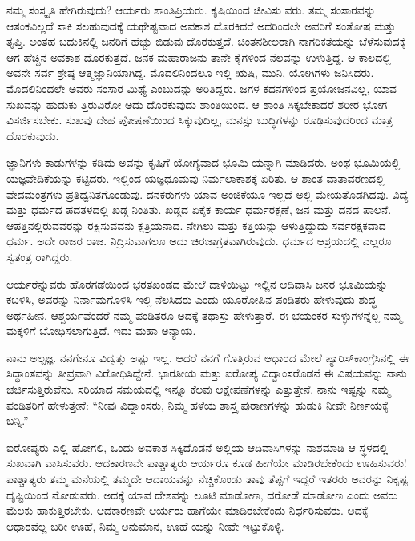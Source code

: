 ನಮ್ಮ ಸಂಸ್ಕೃತಿ ಹೇಗಿರುವುದು? ಆರ್ಯರು ಶಾಂತಿಪ್ರಿಯರು. ಕೃಷಿಯಿಂದ ಜೀವಿಸು ವರು. ತಮ್ಮ ಸಂಸಾರವನ್ನು ಆತಂಕವಿಲ್ಲದೆ ಸಾಕಿ ಸಲಹುವುದಕ್ಕೆ ಯಥೇಷ್ಟವಾದ ಅವಕಾಶ ದೊರಕಿದರೆ ಅದರಿಂದಲೇ ಅವರಿಗೆ ಸಂತೋಷ ಮತ್ತು ತೃಪ್ತಿ. ಅಂತಹ ಬದುಕಿನಲ್ಲಿ ಜನರಿಗೆ ಹೆಚ್ಚು ಬಿಡುವು ದೊರಕುತ್ತದೆ. ಚಿಂತನಶೀಲರಾಗಿ ನಾಗರಿಕತೆಯನ್ನು ಬೆಳೆಸುವುದಕ್ಕೆ ಆಗ ಹೆಚ್ಚಿನ ಅವಕಾಶ ದೊರಕುತ್ತದೆ. ಜನಕ ಮಹಾರಾಜನು ತಾನೇ ಕೈಗಳಿಂದ ನೆಲವನ್ನು ಉಳುತ್ತಿದ್ದ. ಆ ಕಾಲದಲ್ಲಿ ಅವನೇ ಸರ್ವ ಶ್ರೇಷ್ಠ ಆತ್ಮಜ್ಞಾನಿಯಾಗಿದ್ದ. ಮೊದಲಿನಿಂದಲೂ ಇಲ್ಲಿ ಋಷಿ, ಮುನಿ, ಯೋಗಿಗಳು ಜನಿಸಿದರು. ಮೊದಲಿನಿಂದಲೇ ಅವರು ಸಂಸಾರ ಮಿಥ್ಯೆ ಎಂಬುದನ್ನು ಅರಿತಿದ್ದರು. ಜಗಳ ಕದನಗಳಿಂದ ಪ್ರಯೋಜನವಿಲ್ಲ, ಯಾವ ಸುಖವನ್ನು ಹುಡುಕು ತ್ತಿರುವಿರೋ ಅದು ದೊರಕುವುದು ಶಾಂತಿಯಿಂದ. ಆ ಶಾಂತಿ ಸಿಕ್ಕಬೇಕಾದರೆ ಶರೀರ ಭೋಗ ವಿಸರ್ಜಿಸಬೇಕು. ಸುಖವು ದೇಹ ಪೋಷಣೆಯಿಂದ ಸಿಕ್ಕುವುದಿಲ್ಲ, ಮನಸ್ಸು ಬುದ್ಧಿಗಳನ್ನು ರೂಢಿಸುವುದರಿಂದ ಮಾತ್ರ ದೊರಕುವುದು.

ಜ್ಞಾನಿಗಳು ಕಾಡುಗಳನ್ನು ಕಡಿದು ಅವನ್ನು ಕೃಷಿಗೆ ಯೋಗ್ಯವಾದ ಭೂಮಿ ಯನ್ನಾಗಿ ಮಾಡಿದರು. ಅಂಥ ಭೂಮಿಯಲ್ಲಿ ಯಜ್ಞವೇದಿಕೆಯನ್ನು ಕಟ್ಟಿದರು. ಇಲ್ಲಿಂದ ಯಜ್ಞಧೂಮವು ನಿರ್ಮಲಾಕಾಶಕ್ಕೆ ಏರಿತು. ಆ ಶಾಂತ ವಾತಾವರಣದಲ್ಲಿ ವೇದಮಂತ್ರಗಳು ಪ್ರತಿಧ್ವನಿತಗೊಂಡುವು. ದನಕರುಗಳು ಯಾವ ಅಂಜಿಕೆಯೂ ಇಲ್ಲದೆ ಅಲ್ಲಿ ಮೇಯತೊಡಗಿದವು. ವಿದ್ಯೆ ಮತ್ತು ಧರ್ಮದ ಪದತಳದಲ್ಲಿ ಖಡ್ಗ ನಿಂತಿತು. ಖಡ್ಗದ ಏಕೈಕ ಕಾರ್ಯ ಧರ್ಮರಕ್ಷಣೆ, ಜನ ಮತ್ತು ದನದ ಪಾಲನೆ. ಆಪತ್ತಿನಲ್ಲಿರುವವರನ್ನು ರಕ್ಷಿಸುವವನು ಕ್ಷತ್ರಿಯನಾದ. ನೇಗಿಲು ಮತ್ತು ಕತ್ತಿಯನ್ನು ಆಳುತ್ತಿದ್ದುದು ಸರ್ವರಕ್ಷಕವಾದ ಧರ್ಮ. ಅದೇ ರಾಜರ ರಾಜ. ನಿದ್ರಿಸುವಾಗಲೂ ಅದು ಚಿರಜಾಗ್ರತವಾಗಿರುವುದು. ಧರ್ಮದ ಆಶ್ರಯದಲ್ಲಿ ಎಲ್ಲರೂ ಸ್ವತಂತ್ರ ರಾಗಿದ್ದರು.

ಆರ್ಯರೆನ್ನುವರು ಹೊರಗಡೆಯಿಂದ ಭರತಖಂಡದ ಮೇಲೆ ದಾಳಿಯಿಟ್ಟು ಇಲ್ಲಿನ ಆದಿವಾಸಿ ಜನರ ಭೂಮಿಯನ್ನು ಕಬಳಿಸಿ, ಅವರನ್ನು ನಿರ್ನಾಮಗೊಳಿಸಿ ಇಲ್ಲಿ ನೆಲಸಿದರು ಎಂದು ಯೂರೋಪಿನ ಪಂಡಿತರು ಹೇಳುವುದು ಶುದ್ಧ ಅರ್ಥಹೀನ. ಆಶ್ಚರ್ಯವೆಂದರೆ ನಮ್ಮ ಪಂಡಿತರೂ ಅದಕ್ಕೆ ತಥಾಸ್ತು ಹೇಳುತ್ತಾರೆ. ಈ ಭಯಂಕರ ಸುಳ್ಳುಗಳನ್ನೆಲ್ಲ ನಮ್ಮ ಮಕ್ಕಳಿಗೆ ಬೋಧಿಸಲಾಗುತ್ತಿದೆ. ಇದು ಮಹಾ ಅನ್ಯಾಯ.

ನಾನು ಅಲ್ಪಜ್ಞ. ನನಗೇನೂ ವಿದ್ವತ್ತು ಅಷ್ಟು ಇಲ್ಲ. ಆದರೆ ನನಗೆ ಗೊತ್ತಿರುವ ಆಧಾರದ ಮೇಲೆ ಪ್ಯಾರಿಸ್​ ಕಾಂಗ್ರೆಸಿನಲ್ಲಿ ಈ ಸಿದ್ಧಾಂತವನ್ನು ತೀವ್ರವಾಗಿ ವಿರೋಧಿಸಿದ್ದೇನೆ. ಭಾರತೀಯ ಮತ್ತು ಐರೋಪ್ಯ ವಿದ್ವಾಂಸರೊಡನೆ ಈ ವಿಷಯವನ್ನು ನಾನು ಚರ್ಚಿಸುತ್ತಿರುವೆನು. ಸರಿಯಾದ ಸಮಯದಲ್ಲಿ ಇನ್ನೂ ಕೆಲವು ಆಕ್ಷೇಪಣೆಗಳನ್ನು ಎತ್ತುತ್ತೇನೆ. ನಾನು ಇಷ್ಟನ್ನು ನಮ್ಮ ಪಂಡಿತರಿಗೆ ಹೇಳುತ್ತೇನೆ: “ನೀವು ವಿದ್ವಾಂಸರು, ನಿಮ್ಮ ಹಳೆಯ ಶಾಸ್ತ್ರ ಪುರಾಣಗಳನ್ನು ಹುಡುಕಿ ನೀವೇ ನಿರ್ಣಯಕ್ಕೆ ಬನ್ನಿ.”

ಐರೋಪ್ಯರು ಎಲ್ಲಿ ಹೋಗಲಿ, ಒಂದು ಅವಕಾಶ ಸಿಕ್ಕಿದೊಡನೆ ಅಲ್ಲಿಯ ಆದಿವಾಸಿಗಳನ್ನು ನಾಶಮಾಡಿ ಆ ಸ್ಥಳದಲ್ಲಿ ಸುಖವಾಗಿ ವಾಸಿಸುವರು. ಆದಕಾರಣವೇ ಪಾಶ್ಚಾತ್ಯರು ಆರ್ಯರೂ ಕೂಡ ಹೀಗೆಯೇ ಮಾಡಿರಬೇಕೆಂದು ಊಹಿಸುವರು! ಪಾಶ್ಚಾತ್ಯರು ತಮ್ಮ ಮನೆಯಲ್ಲಿ ತಮ್ಮದೇ ಆದಾಯವನ್ನು ನೆಚ್ಚಿಕೊಂಡು ತಾವು ತೆಪ್ಪಗೆ ಇದ್ದರೆ ಇತರರು ಅವರನ್ನು ನಿಕೃಷ್ಟ ದೃಷ್ಟಿಯಿಂದ ನೋಡುವರು. ಅದಕ್ಕೆ ಯಾವ ದೇಶವನ್ನು ಲೂಟಿ ಮಾಡೋಣ, ದರೋಡೆ ಮಾಡೋಣ ಎಂದು ಅವರು ಮೆಲಕು ಹಾಕುತ್ತಿರಬೇಕು. ಆದಕಾರಣವೇ ಆರ್ಯರು ಹಾಗೆಯೇ ಮಾಡಿರಬೇಕೆಂದು ನಿರ್ಧರಿಸುವರು. ಅದಕ್ಕೆ ಆಧಾರವೆಲ್ಲ ಬರೀ ಊಹೆ, ನಿಮ್ಮ ಅನುಮಾನ, ಊಹೆ ಯನ್ನು ನೀವೇ ಇಟ್ಟುಕೊಳ್ಳಿ.

